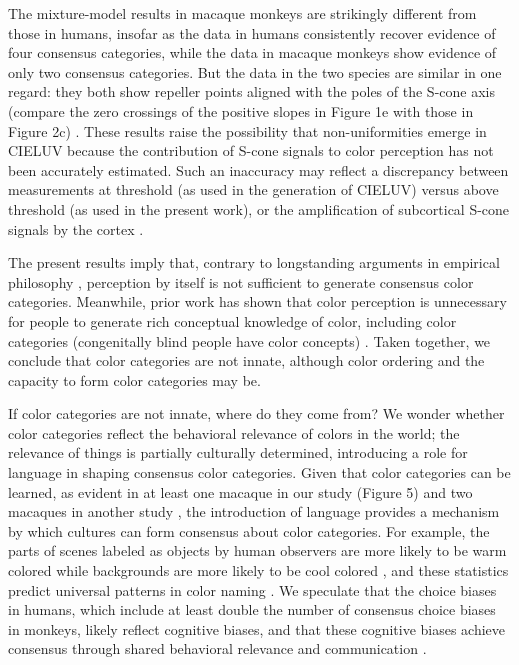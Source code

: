 The mixture-model results in macaque monkeys are strikingly different from those in humans, insofar as the data in humans consistently recover evidence of four consensus categories, while the data in macaque monkeys show evidence of only two consensus categories. But the data in the two species are similar in one regard: they both show repeller points aligned with the poles of the S-cone axis (compare the zero crossings of the positive slopes in Figure 1e with those in Figure 2c) \citep{skelton_biological_2017,bae_why_2015,panichello_error-correcting_2019}. These results raise the possibility that non-uniformities emerge in CIELUV because the contribution of S-cone signals to color perception has not been accurately estimated. Such an inaccuracy may reflect a discrepancy between measurements at threshold (as used in the generation of CIELUV) versus above threshold (as used in the present work), or the amplification of subcortical S-cone signals by the cortex \citep{RN655}.

The present results imply that, contrary to longstanding arguments in empirical philosophy \citep{RN18743}, perception by itself is not sufficient to generate consensus color categories. Meanwhile, prior work has shown that color perception is unnecessary for people to generate rich conceptual knowledge of color, including color categories (congenitally blind people have color concepts) \citep{RN18700}. Taken together, we conclude that color categories are not innate, although color ordering and the capacity to form color categories may be. 

If color categories are not innate, where do they come from? We wonder whether color categories reflect the behavioral relevance of colors in the world; the relevance of things is partially culturally determined, introducing a role for language in shaping consensus color categories. Given that color categories can be learned, as evident in at least one macaque in our study (Figure 5) and two macaques in another study \citep{panichello_error-correcting_2019}, the introduction of language provides a mechanism by which cultures can form consensus about color categories. For example, the parts of scenes labeled as objects by human observers are more likely to be warm colored while backgrounds are more likely to be cool colored \citep{rosenthal_color_2018}, and these statistics predict universal patterns in color naming \citep{gibson_color_2017}. We speculate that the choice biases in humans, which include at least double the number of consensus choice biases in monkeys, likely reflect cognitive biases, and that these cognitive biases achieve consensus through shared behavioral relevance and communication \citep{RN18511,RN18514,RN18602}. 
